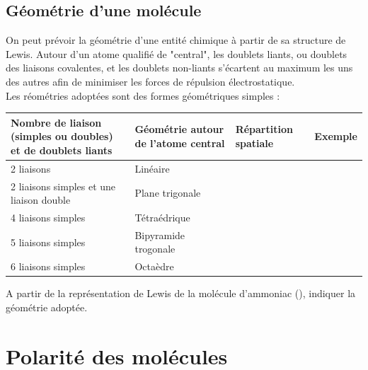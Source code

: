 \documentclass[a4paper,11pt,fleqn]{scrartcl}
\begin{document}
    \subsection{Géométrie d'une molécule}
    On peut prévoir la géométrie d'une entité chimique à partir de sa structure de Lewis. Autour d'un atome qualifié de "central", les doublets liants, ou doublets des liaisons covalentes, et les doublets non-liants s'écartent au maximum les uns des autres afin de minimiser les forces de répulsion électrostatique.\\
    Les réométries adoptées sont des formes géométriques simples :
    \begin{center}
        \begin{tabular}{|m{.2\linewidth}|m{.2\linewidth}|m{.2\linewidth}|m{.2\linewidth}|}
            \hline
            \textbf{Nombre de liaison (simples ou doubles) et de doublets liants}  & \textbf{Géométrie autour de l'atome central} & \textbf{Répartition spatiale} & \textbf{Exemple}\\
            \hline
            2 liaisons & Linéaire & \rule{0pt}{3em} & \\
            \hline
            2 liaisons simples et une liaison double & Plane trigonale  & \rule{0pt}{4em}& \\
            \hline
            4 liaisons simples & Tétraédrique & \rule{0pt}{4em}& \\
            \hline
            5 liaisons simples & Bipyramide trogonale & \rule{0pt}{5em}& \\
            \hline
            6 liaisons simples & Octaèdre & \rule{0pt}{5em} & \\
            \hline
        \end{tabular}
    \end{center}
    \begin{exemple}
        A partir de la représentation de Lewis de la molécule d'ammoniac (), indiquer la géométrie adoptée.\\
        \vspace{5em}
    \end{exemple}

\section{Polarité des molécules}
\end{document}

